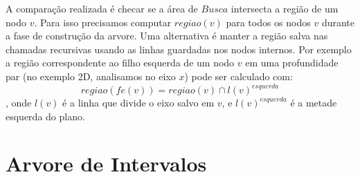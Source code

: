 A comparação realizada é checar se a área de \(Busca\) intersecta a região
de um nodo \(v\). Para isso precisamos computar \(regiao(v)\) para todos os nodos \(v\)
durante a fase de construção da arvore.
Uma alternativa é manter a região salva nas chamadas recursivas usando as linhas guardadas
nos nodos internos. Por exemplo a região correspondente ao filho esquerda de um nodo
\(v\) em uma profundidade par (no exemplo 2D, analisamos no eixo \(x\)) pode ser calculado com:
\[
    regiao(fe(v)) = regiao(v) \cap l(v)^{esquerda}
\],
onde \(l(v)\) é a linha que divide o eixo salvo em \(v\), e \(l(v)^{esquerda}\) é a metade
esquerda do plano.


\section{Arvore de Intervalos}



